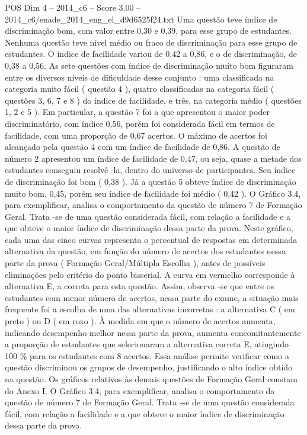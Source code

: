 \begin{textsample}{POS Dim 4 – 2014\_c6 – Score 3.00 – 2014\_c6/enade\_2014\_eng\_el\_d9d6525f24.txt}
Uma questão teve índice de discriminação bom, com valor entre 0,30 e 0,39, para esse grupo de estudantes.
Nenhuma questão teve nível médio ou fraco de discriminação para esse grupo de estudantes.
O índice de facilidade variou de 0,42 a 0,86, e o de discriminação, de 0,38 a 0,56.
As sete questões com índice de discriminação muito bom figuraram entre os diversos níveis de dificuldade desse conjunto : uma classificada na categoria muito fácil ( questão 4 ), quatro classificadas na categoria fácil ( questões 3, 6, 7 e 8 ) do índice de facilidade, e três, na categoria médio ( questões 1, 2 e 5 ).
Em particular, a questão 7 foi a que apresentou o maior poder discriminatório, com índice 0,56, porém foi considerada fácil em termos de facilidade, com uma proporção de 0,67 acertos.
O máximo de acertos foi alcançado pela questão 4 com um índice de facilidade de 0,86.
A questão de número 2 apresentou um índice de facilidade de 0,47, ou seja, quase a metade dos estudantes conseguiu resolvê -la, dentro do universo de participantes.
Seu índice de discriminação foi bom ( 0,38 ).
Já a questão 5 obteve índice de discriminação muito bom, 0,45, porém seu índice de facilidade foi médio ( 0,42 ).
O Gráfico 3.4, para exemplificar, analisa o comportamento da questão de número 7 de Formação Geral.
Trata -se de uma questão considerada fácil, com relação a facilidade e a que obteve o maior índice de discriminação dessa parte da prova.
Neste gráfico, cada uma das cinco curvas representa o percentual de respostas em determinada alternativa da questão, em função do número de acertos dos estudantes nessa parte da prova ( Formação Geral/Múltipla Escolha ), antes de possíveis eliminações pelo critério do ponto bisserial.
A curva em vermelho corresponde à alternativa E, a correta para esta questão.
Assim, observa -se que entre os estudantes com menor número de acertos, nessa parte do exame, a situação mais frequente foi a escolha de uma das alternativas incorretas : a alternativa C ( em preto ) ou D ( em roxo ).
À medida em que o número de acertos aumenta, indicando desempenho melhor nessa parte da prova, aumenta concomitantemente a proporção de estudantes que selecionaram a alternativa correta E, atingindo 100 \% para os estudantes com 8 acertos.
Essa análise permite verificar como a questão discriminou os grupos de desempenho, justificando o alto índice obtido na questão.
Os gráficos relativos às demais questões de Formação Geral constam do Anexo I.
O Gráfico 3.4, para exemplificar, analisa o comportamento da questão de número 7 de Formação Geral.
Trata -se de uma questão considerada fácil, com relação a facilidade e a que obteve o maior índice de discriminação dessa parte da prova.

\end{textsample}
